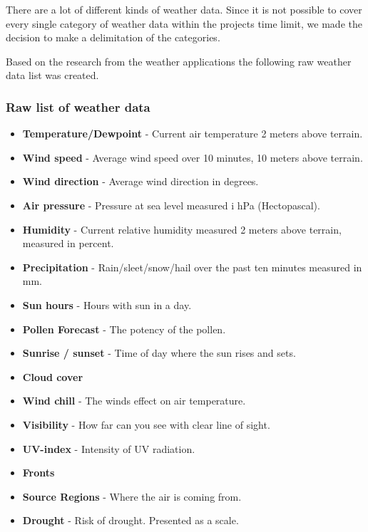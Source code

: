 There are a lot of different kinds of weather data. 
Since it is not possible to cover every single category of weather data within the projects time limit, we made the decision to make a delimitation of the categories.


Based on the research from the weather applications the following raw weather data list was created.

\subsubsection*{Raw list of weather data} %
\label{ssub:raw_list_of_weather_data}

\begin{itemize}
     \item \textbf{Temperature/Dewpoint} - Current air temperature 2 meters above terrain.
     \item \textbf{Wind speed} - Average wind speed over 10 minutes, 10 meters above terrain.
     \item \textbf{Wind direction} - Average wind direction in degrees.
     \item \textbf{Air pressure} - Pressure at sea level measured i hPa (Hectopascal).
     \item \textbf{Humidity} - Current relative humidity measured 2 meters above terrain, measured in percent.
     \item \textbf{Precipitation} - Rain/sleet/snow/hail over the past ten minutes measured in mm.
     \item \textbf{Sun hours} - Hours with sun in a day.
     \item \textbf{Pollen Forecast} - The potency of the pollen. 
     \item \textbf{Sunrise / sunset} - Time of day where the sun rises and sets.
     \item \textbf{Cloud cover}
     \item \textbf{Wind chill} - The winds effect on air temperature.
     \item \textbf{Visibility} - How far can you see with clear line of sight.
     \item \textbf{UV-index} - Intensity of UV radiation.
     \item \textbf{Fronts} 
     \item \textbf{Source Regions} - Where the air is coming from.
     \item \textbf{Drought} - Risk of drought. Presented as a scale.
 \end{itemize}

